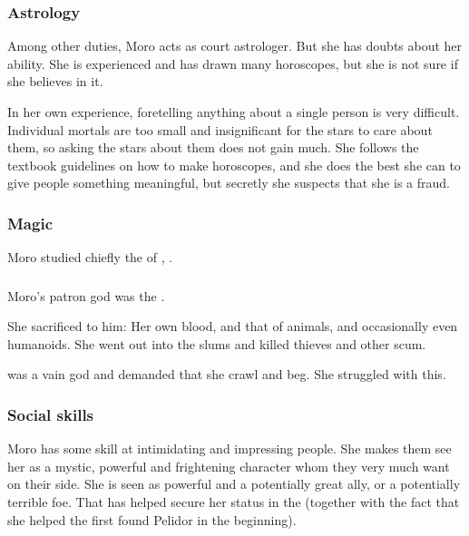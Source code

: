 \subsubsection{Astrology}
Among other duties, Moro acts as court astrologer. 
But she has doubts about her ability. 
She is experienced and has drawn many horoscopes, but she is not sure if she believes in it. 

In her own experience, foretelling anything about a single person is very difficult. 
Individual mortals are too small and insignificant for the stars to care about them, so asking the stars about them does not gain much. 
She follows the textbook guidelines on how to make horoscopes, and she does the best she can to give people something meaningful, but secretly she suspects that she is a fraud. 





\subsubsection{Magic}
Moro \Cornel studied chiefly the \arcanum of \Nasshikerr, . 





\subsubsection{\Nasshikerr}
Moro's patron god was the \Taortha {}. 

She sacrificed to him: 
Her own blood, and that of animals, and occasionally even humanoids. 
She went out into the slums and killed thieves and other scum. 

\Nasshikerr{} was a vain god and demanded that she crawl and beg. 
She struggled with this. 





\subsubsection{Social skills}
Moro has some skill at intimidating and impressing people. 
She makes them see her as a mystic, powerful and frightening character whom they very much want on their side. 
She is seen as powerful and a potentially great ally, or a potentially terrible foe. 
That has helped secure her status in the \ishrah{} (together with the fact that she helped the first \rayuths found Pelidor in the beginning). 


